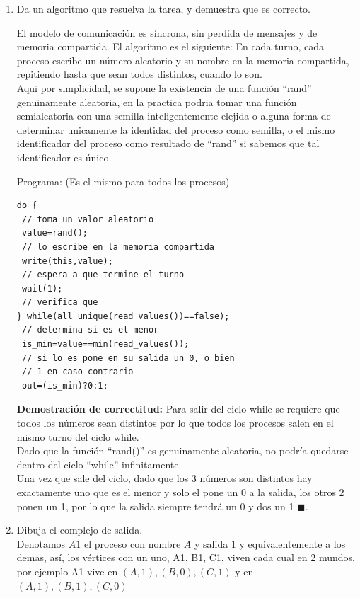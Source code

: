 \documentclass{article}
\begin{document}
\begin{enumerate}
\begin{enumerate}
\item Da un algoritmo que resuelva la tarea, y demuestra que es correcto.

El modelo de comunicación es síncrona, sin perdida de mensajes y de memoria compartida.
El algoritmo es el siguiente:
En cada turno, cada proceso escribe un número aleatorio y su nombre en la memoria compartida, repitiendo hasta que sean todos distintos, cuando lo son.\\

Aqui por simplicidad, se supone la existencia de una función ``rand'' genuinamente aleatoria, en la practica podria tomar una función semialeatoria con una semilla inteligentemente elejida o alguna forma de determinar unicamente la identidad del proceso como semilla, o el mismo identificador del proceso como resultado de ``rand'' si sabemos que tal identificador es único.
\newpage

Programa: (Es el mismo para todos los procesos)\\
\begin{lstlisting}[frame=single]
do {
 // toma un valor aleatorio
 value=rand();                        
 // lo escribe en la memoria compartida
 write(this,value);             
 // espera a que termine el turno
 wait(1);                   
 // verifica que        
} while(all_unique(read_values())==false); 
 // determina si es el menor
 is_min=value==min(read_values());
 // si lo es pone en su salida un 0, o bien
 // 1 en caso contrario
 out=(is_min)?0:1;       
\end{lstlisting}

{\bf Demostración de correctitud:}
Para salir del ciclo while se requiere que todos los números sean distintos por lo que todos los procesos salen en el mismo turno del ciclo while.\\
Dado que la función ``rand()'' es genuinamente aleatoria, no podría quedarse dentro del ciclo ``while'' infinitamente.\\
Una vez que sale del ciclo, dado que los 3 números son distintos hay exactamente uno que es el menor y solo el pone un 0 a la salida, los otros 2 ponen un 1, por lo que la salida siempre tendrá un 0 y dos un 1 $\blacksquare$.

\item Dibuja el complejo de salida.\\
Denotamos $A1$ el proceso con nombre $A$ y salida $1$ y equivalentemente a los demas, así, los vértices con un uno, A1, B1, C1, viven cada cual en 2 mundos, por ejemplo A1 vive en ${(A,1),(B,0),(C,1)}$ y en ${(A,1),(B,1),(C,0)}$  


\end{enumerate}
\end{enumerate}
\end{document}
